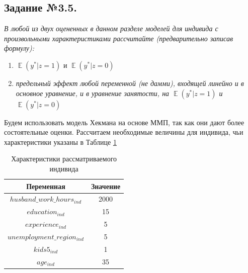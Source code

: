 \documentclass[a4paper,12pt]{article}
\DeclareMathOperator{\EX}{\mathbb{E}}%
\begin{document}
\subsection{Задание №3.5.} 
\textit{В любой из двух оцененных в данном разделе моделей для индивида с
произвольными характеристиками рассчитайте (предварительно записав формулу):}

\begin{enumerate}[label=\Alph*)]
	\item $\EX( y^* | z = 1)$ и $\EX( y^* | z = 0)$
	
	\item \textit{предельный эффект любой переменной (не дамми), входящей линейно и в
		основное уравнение, и в уравнение занятости, на $\EX( y^* | z = 1)$ и $\EX( y^* | z = 0)$}
\end{enumerate}

 Будем использовать модель Хекмана на основе ММП, так как они дают более состоятельные оценки. Рассчитаем необходимые величины для индивида, чьи характеристики указаны в Таблице \ref{individ5}
 
 \begin{table}[!h]
 	\caption{Характеристики рассматриваемого индивида}
 	\label{individ5}
 	\centering
 	\small
 	\begin{tabular}{|c|c|}
 		\hline
 		Переменная &  Значение  \\ 
 		\hline
 		$husband\_work\_hours_{ind} $ &2000 \\ 
 		\hline
 		$education_{ind} $ &15 \\ 		
 		\hline
 		$experience_{ind} $ &5 \\ 	
 		\hline
 		 $unemployment\_region_{ind} $ &5 \\ 	
 		\hline
 		$kids5_{ind} $ &1 \\ 	
 		\hline
 		$age_{ind} $ &35 \\ 
 		\hline
 	\end{tabular}
 \end{table}
 
\end{document}
